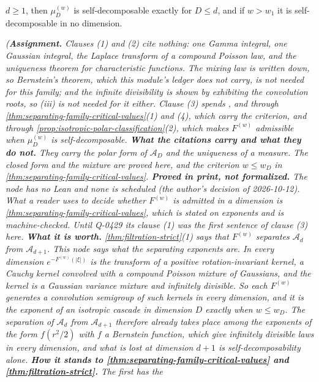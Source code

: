 \begin{proposition}
\begin{enumerate}
$d \ge 1$, then $\mu^{(w)}_D$ is self-decomposable exactly for $D \le d$, and if $w > w_1$ it is
self-decomposable in no dimension.
\end{enumerate}
\statusA\quad{}\quad{}\quad{}\quad\emph{(\textbf{Assignment.} Clauses
(1) and (2) cite nothing: one Gamma integral, one Gaussian integral, the Laplace transform of a
compound Poisson law, and the uniqueness theorem for characteristic functions. The mixing law is
written down, so Bernstein's theorem, which this module's ledger does not carry, is not needed
for this family; and the infinite divisibility is shown by exhibiting the convolution roots, so
(iii) is not needed for it either. Clause (3) spends ,  and
 through \ref{thm:separating-family-critical-values}(1) and (4), which carry the
criterion, and through \ref{prop:isotropic-polar-classification}(2), which makes $F^{(w)}$
admissible when $\mu^{(w)}_D$ is self-decomposable.
\textbf{What the citations carry and what they do not.} They carry the polar form of
$\mathcal{A}_D$ and the uniqueness of a \Levy{} measure. The closed form and the mixture are
proved here, and the criterion $w \le w_D$ in \ref{thm:separating-family-critical-values}.
\textbf{Proved in print, not formalized.} The node has no Lean and none is scheduled (the
author's decision of 2026-10-12). What a reader uses to decide whether $F^{(w)}$ is admitted in
a dimension is \ref{thm:separating-family-critical-values}, which is stated on exponents and is
machine-checked. Until Q-0429 its clause (1) was the first sentence of clause (3) here.
\textbf{What it is worth.}
\ref{thm:filtration-strict}(1) says that $F^{(w)}$ separates $\mathcal{A}_d$ from
$\mathcal{A}_{d+1}$. This node says what the separating exponents are. In every dimension
$e^{-F^{(w)}(|\xi|)}$ is the transform of a positive rotation-invariant kernel, a Cauchy kernel
convolved with a compound Poisson mixture of Gaussians, and the kernel is a Gaussian variance
mixture and infinitely divisible. So each $F^{(w)}$ generates a convolution semigroup of such
kernels in every dimension, and it is the exponent of an isotropic cascade in dimension $D$
exactly when $w \le w_D$. The separation of $\mathcal{A}_d$ from $\mathcal{A}_{d+1}$ therefore
already takes place among the exponents of the form $f(r^2/2)$ with $f$ a Bernstein function,
which give infinitely divisible laws in every dimension, and what is lost at dimension $d + 1$ is
self-decomposability alone. \textbf{How it stands to
\ref{thm:separating-family-critical-values} and \ref{thm:filtration-strict}.} The first has the
}
\end{proposition}
